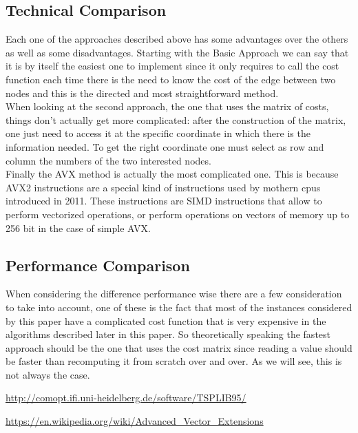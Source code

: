 \documentclass[a4paper]{article}
\begin{document}
\subsection[short]{Technical Comparison}

Each one of the approaches described above has some advantages over the others as well as some disadvantages. Starting with the Basic Approach we can say that it is by itself the easiest one to implement since it only requires to call the cost function each time there is the need to know the cost of the edge between two nodes and this is the directed and most straightforward method. \\
When looking at the second approach, the one that uses the matrix of costs, things don't actually get more complicated: after the construction of the matrix, one just need to access it at the specific coordinate in which there is the information needed. To get the right coordinate one must select as row and column the numbers of the two interested nodes. \\
Finally the AVX method is actually the most complicated one. This is because AVX2 instructions are a special kind of instructions used by mothern cpus introduced in 2011\cite{avxWikipedia}. These instructions are SIMD instructions that allow to perform vectorized operations, or perform operations on vectors of memory up to 256 bit in the case of simple AVX\cite{avxWikipedia}.

\subsection[short]{Performance Comparison}

When considering the difference performance wise there are a few consideration to take into account, one of these is the fact that most of the instances considered by this paper have a complicated cost function that is very expensive in the algorithms described later in this paper. So theoretically speaking the fastest approach should be the one that uses the cost matrix since reading a value should be faster than recomputing it from scratch over and over. As we will see, this is not always the case. 





\begin{thebibliography}{9}
	\url{http://comopt.ifi.uni-heidelberg.de/software/TSPLIB95/}

	\url{https://en.wikipedia.org/wiki/Advanced_Vector_Extensions}

\end{thebibliography}
\end{document}
